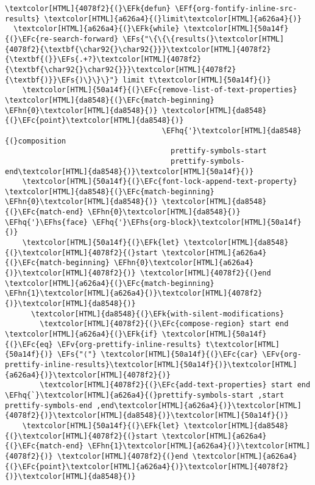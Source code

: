 \documentclass{scrartcl}
\newcommand{\EFk}[1]{\textcolor{EFk}{#1}} %
\newcommand{\EFs}[1]{\textcolor{EFs}{#1}} %
\newcommand{\EFc}[1]{\textcolor{EFc}{#1}} %
\newcommand{\EFv}[1]{\textcolor{EFv}{#1}} %
\newcommand{\EFf}[1]{\textcolor{EFf}{#1}} %
\newcommand{\EFhn}[1]{\textcolor{EFhn}{\textbf{#1}}} %
\newcommand{\EFhq}[1]{\textcolor{EFhq}{#1}} %
\newcommand{\EFhs}[1]{\textcolor{EFhs}{#1}} %
\begin{document}
\begin{enumerate}
\begin{Code}
\begin{Verbatim}[]
\textcolor[HTML]{4078f2}{(}\EFk{defun} \EFf{org-fontify-inline-src-results} \textcolor[HTML]{a626a4}{(}limit\textcolor[HTML]{a626a4}{)}
  \textcolor[HTML]{a626a4}{(}\EFk{while} \textcolor[HTML]{50a14f}{(}\EFc{re-search-forward} \EFs{"\{\{\{results(}\textcolor[HTML]{4078f2}{\textbf{\char92{}\char92{}}}\textcolor[HTML]{4078f2}{\textbf{(}}\EFs{.+?}\textcolor[HTML]{4078f2}{\textbf{\char92{}\char92{}}}\textcolor[HTML]{4078f2}{\textbf{)}}\EFs{)\}\}\}"} limit t\textcolor[HTML]{50a14f}{)}
    \textcolor[HTML]{50a14f}{(}\EFc{remove-list-of-text-properties} \textcolor[HTML]{da8548}{(}\EFc{match-beginning} \EFhn{0}\textcolor[HTML]{da8548}{)} \textcolor[HTML]{da8548}{(}\EFc{point}\textcolor[HTML]{da8548}{)}
                                    \EFhq{'}\textcolor[HTML]{da8548}{(}composition
                                      prettify-symbols-start
                                      prettify-symbols-end\textcolor[HTML]{da8548}{)}\textcolor[HTML]{50a14f}{)}
    \textcolor[HTML]{50a14f}{(}\EFc{font-lock-append-text-property} \textcolor[HTML]{da8548}{(}\EFc{match-beginning} \EFhn{0}\textcolor[HTML]{da8548}{)} \textcolor[HTML]{da8548}{(}\EFc{match-end} \EFhn{0}\textcolor[HTML]{da8548}{)} \EFhq{'}\EFhs{face} \EFhq{'}\EFhs{org-block}\textcolor[HTML]{50a14f}{)}
    \textcolor[HTML]{50a14f}{(}\EFk{let} \textcolor[HTML]{da8548}{(}\textcolor[HTML]{4078f2}{(}start \textcolor[HTML]{a626a4}{(}\EFc{match-beginning} \EFhn{0}\textcolor[HTML]{a626a4}{)}\textcolor[HTML]{4078f2}{)} \textcolor[HTML]{4078f2}{(}end \textcolor[HTML]{a626a4}{(}\EFc{match-beginning} \EFhn{1}\textcolor[HTML]{a626a4}{)}\textcolor[HTML]{4078f2}{)}\textcolor[HTML]{da8548}{)}
      \textcolor[HTML]{da8548}{(}\EFk{with-silent-modifications}
        \textcolor[HTML]{4078f2}{(}\EFc{compose-region} start end \textcolor[HTML]{a626a4}{(}\EFk{if} \textcolor[HTML]{50a14f}{(}\EFc{eq} \EFv{org-prettify-inline-results} t\textcolor[HTML]{50a14f}{)} \EFs{"⟨"} \textcolor[HTML]{50a14f}{(}\EFc{car} \EFv{org-prettify-inline-results}\textcolor[HTML]{50a14f}{)}\textcolor[HTML]{a626a4}{)}\textcolor[HTML]{4078f2}{)}
        \textcolor[HTML]{4078f2}{(}\EFc{add-text-properties} start end \EFhq{`}\textcolor[HTML]{a626a4}{(}prettify-symbols-start ,start prettify-symbols-end ,end\textcolor[HTML]{a626a4}{)}\textcolor[HTML]{4078f2}{)}\textcolor[HTML]{da8548}{)}\textcolor[HTML]{50a14f}{)}
    \textcolor[HTML]{50a14f}{(}\EFk{let} \textcolor[HTML]{da8548}{(}\textcolor[HTML]{4078f2}{(}start \textcolor[HTML]{a626a4}{(}\EFc{match-end} \EFhn{1}\textcolor[HTML]{a626a4}{)}\textcolor[HTML]{4078f2}{)} \textcolor[HTML]{4078f2}{(}end \textcolor[HTML]{a626a4}{(}\EFc{point}\textcolor[HTML]{a626a4}{)}\textcolor[HTML]{4078f2}{)}\textcolor[HTML]{da8548}{)}

\end{Verbatim}
\end{Code}
\end{enumerate}
\end{document}
